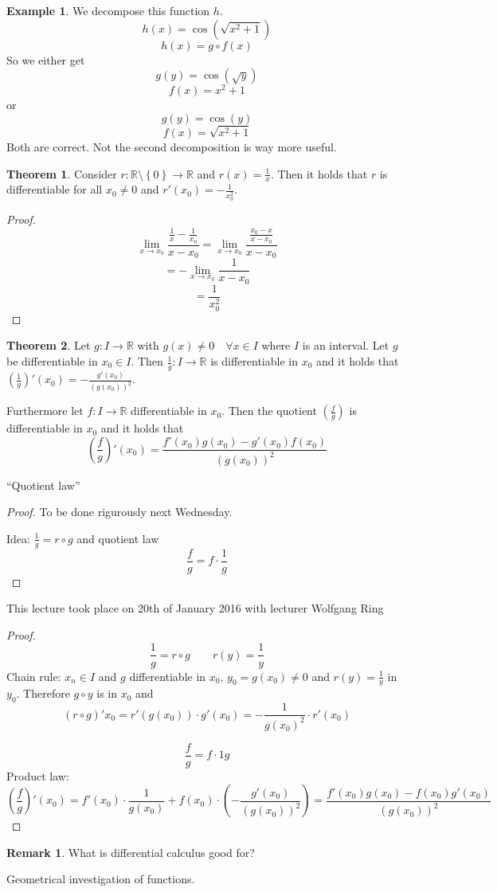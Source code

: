 \documentclass[a4paper,landscape,twocolumn]{article}
\theoremstyle{definition}
\newtheorem{theorem}{Theorem}
\newtheorem{rem}{Remark}
\newtheorem{ex}{Example}
\newcommand\set[1]{\left\{#1\right\}}
\newcommand\meta[3]{\begin{mdframed}[skipbelow=4pt,skipabove=4pt,innermargin=1pt,innerleftmargin=1pt,innerrightmargin=1pt]\begin{center}\small{\textdownarrow{} This #1 took place on #2 with lecturer #3}\end{center}\end{mdframed}}
\begin{document}
\begin{ex}
  We decompose this function $h$.
  \[ h(x) = \cos(\sqrt{x^2 + 1}) \]
  \[ h(x) = g \circ f(x) \]
  So we either get
  \[ g(y) = \cos(\sqrt{y}) \]
  \[ f(x) = x^2 + 1 \]
  or
  \[ g(y) = \cos(y) \]
  \[ f(x) = \sqrt{x^2 + 1} \]
  Both are correct. Not the second decomposition is way more useful.
\end{ex}

\begin{theorem}
  Consider $r: \mathbb R \setminus \set{0} \to \mathbb R$
  and $r(x) = \frac1x$. Then it holds that $r$ is differentiable
  for all $x_0 \neq 0$ and $r'(x_0) = -\frac1{x_0^2}$.
\end{theorem}
\begin{proof}
  \[ \lim_{x \to x_0} \frac{\frac1x - \frac1{x_0}}{x - x_0} = \lim_{x \to x_0} \frac{\frac{x_0 - x}{x - x_0}}{x - x_0} \]
  \[ = -\lim_{x \to x_0} \frac1{x - x_0} \]
  \[ = \frac1{x_0^2} \]
\end{proof}

\begin{theorem}
  Let $g: I \to \mathbb R$ with $g(x) \neq 0 \quad\forall x \in I$ where $I$ is an interval.
  Let $g$ be differentiable in $x_0 \in I$. Then $\frac1{g}: I \to \mathbb R$ is differentiable in $x_0$
  and it holds that $\left(\frac1{g}\right)'(x_0) = -\frac{g'(x_0)}{(g(x_0))^2}$.

  Furthermore let $f: I \to \mathbb R$ differentiable in $x_0$. Then the quotient
  $\left(\frac{f}{g}\right)$ is differentiable in $x_0$ and it holds that
  \[
    \left(\frac{f}{g}\right)'(x_0) = \frac{f'(x_0) g(x_0) - g'(x_0) f(x_0)}{(g(x_0))^2}
  \]
  \begin{center}
    \enquote{Quotient law}
  \end{center}
\end{theorem}
\begin{proof}
  To be done rigurously next Wednesday.

  Idea: $\frac1{g} = r \circ g$ and quotient law
  \[ \frac fg = f \cdot \frac1g \]
\end{proof}

\meta{lecture}{20th of January 2016}{Wolfgang Ring}

\begin{proof}
  \[ \frac1g = r \circ g \qquad r(y) = \frac1y \]
  Chain rule: $x_n \in I$ and $g$ differentiable in $x_0$,
  $y_0 = g(x_0) \neq 0$ and $r(y) = \frac1y$ in $y_0$.
  Therefore $g\circ y$ is in $x_0$ and
  \[
    (r \circ g)' x_0 = r'(g(x_0)) \cdot g'(x_0)
    = -\frac1{{g(x_0)}^2} \cdot r'(x_0)
  \]

  \[ \frac fg = f \cdot 1g \]
  Product law:
  \[
    \left(\frac fg\right)'(x_0) = f'(x_0) \cdot \frac1{g(x_0)} +
    f(x_0) \cdot \left(-\frac{g'(x_0)}{(g(x_0))^2}\right)
    = \frac{f'(x_0) g(x_0) - f(x_0) g'(x_0)}{(g(x_0))^2}
  \]
\end{proof}
\begin{rem}
  What is differential calculus good for?

  Geometrical investigation of functions.
\end{rem}
\end{document}

